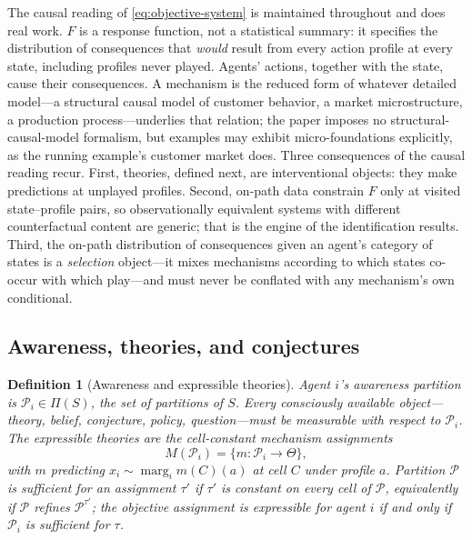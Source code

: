 \documentclass[11pt]{article}
\newtheorem{definition}[assumption]{Definition}
\theoremstyle{definition}
\newcommand{\marg}[1]{\operatorname{marg}_{#1}}
\begin{document}
The causal reading of \cref{eq:objective-system} is maintained throughout and
does real work.  $F$ is a response function, not a statistical summary: it
specifies the distribution of consequences that \emph{would} result from
every action profile at every state, including profiles never played.
Agents' actions, together with the state, cause their consequences.  A
mechanism is the reduced form of whatever detailed model---a structural
causal model of customer behavior, a market microstructure, a production
process---underlies that relation; the paper imposes no structural-causal-model
formalism, but examples may exhibit micro-foundations explicitly, as the
running example's customer market does.  Three consequences of the causal
reading recur.  First, theories, defined next, are interventional objects:
they make predictions at unplayed profiles.  Second, on-path data constrain
$F$ only at visited state--profile pairs, so observationally equivalent
systems with different counterfactual content are generic; that is the engine
of the identification results.  Third, the on-path distribution of
consequences given an agent's category of states is a \emph{selection}
object---it mixes mechanisms according to which states co-occur with which
play---and must never be conflated with any mechanism's own conditional.

\subsection{Awareness, theories, and conjectures}
\label{sec:awareness-sub}

\begin{definition}[Awareness and expressible theories]
\label{def:awareness}
Agent $i$'s awareness partition is $\mathcal P_i\in\Pi(S)$, the set of
partitions of $S$.  Every consciously available object---theory, belief,
conjecture, policy, question---must be measurable with respect to
$\mathcal P_i$.  The \emph{expressible theories} are the cell-constant
mechanism assignments
\begin{equation}
M(\mathcal P_i)=\{m:\mathcal P_i\to\Theta\},
\label{eq:expressible}
\end{equation}
with $m$ predicting $x_i\sim\marg{i}m(C)(a)$ at cell $C$ under profile $a$.
Partition $\mathcal P$ is \emph{sufficient} for an assignment $\tau'$ if
$\tau'$ is constant on every cell of $\mathcal P$, equivalently if $\mathcal
P$ refines $\mathcal P^{\tau'}$; the objective assignment is expressible for
agent $i$ if and only if $\mathcal P_i$ is sufficient for $\tau$.
\end{definition}
\end{document}
